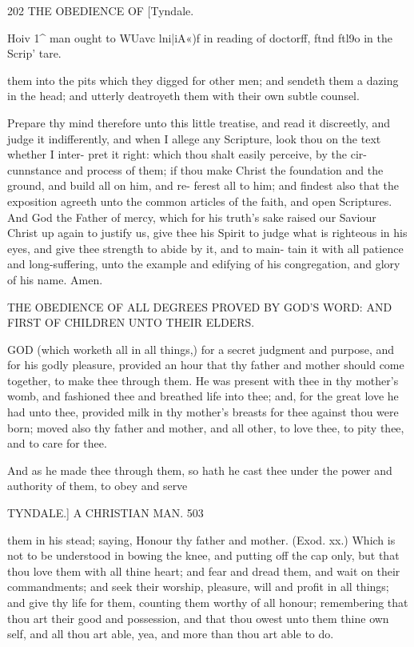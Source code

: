 \documentclass{custom}
\begin{document}
202
THE OBEDIENCE OF
[Tyndale.

Hoiv 1^ man 
ought to 
WUavc 
lni|iA«)f in 
reading of 
doctorff, 
ftnd ftl9o in 
the Scrip' 
tare. 

them into the pits which they digged for other men; and
sendeth them a dazing in the head; and utterly deatroyeth
them with their own subtle counsel.

Prepare thy mind therefore unto this little treatise, and 
read it discreetly, and judge it indifferently, and when I
allege any Scripture, look thou on the text whether I inter- 
pret it right: which thou shalt easily perceive, by the cir-
cunnstance and process of them; if thou make Christ the 
foundation and the ground, and build all on him, and re- 
ferest all to him; and findest also that the exposition 
agreeth unto the common articles of the faith, and open 
Scriptures. And God the Father of mercy, which for his 
truth's sake raised our Saviour Christ up again to justify 
us, give thee his Spirit to judge what is righteous in his 
eyes, and give thee strength to abide by it, and to main- 
tain it with all patience and long-suffering, unto the 
example and edifying of his congregation, and glory of his 
name. Amen. 


THE 
OBEDIENCE OF ALL DEGREES 
PROVED BY GOD'S WORD: AND FIRST OF CHILDREN 
UNTO THEIR ELDERS.

GOD (which worketh all in all things,) for a secret 
judgment and purpose, and for his godly pleasure, 
provided an hour that thy father and mother should come 
together, to make thee through them. He was present 
with thee in thy mother's womb, and fashioned thee 
and breathed life into thee; and, for the great love he had 
unto thee, provided milk in thy mother's breasts for thee 
against thou were born; moved also thy father and 
mother, and all other, to love thee, to pity thee, and to 
care for thee. 

And as he made thee through them, so hath he cast thee 
under the power and authority of them, to obey and serve 


TYNDALE.] 
A CHRISTIAN MAN.
503 

them in his stead; saying, Honour thy father and mother. 
(Exod. xx.) Which is not to be understood in bowing 
the knee, and putting off the cap only, but that thou love 
them with all thine heart; and fear and dread them, and 
wait on their commandments; and seek their worship,
pleasure, will and profit in all things; and give thy life for 
them, counting them worthy of all honour; remembering 
that thou art their good and possession, and that thou 
owest unto them thine own self, and all thou art able, yea, 
and more than thou art able to do.
\end{document}
